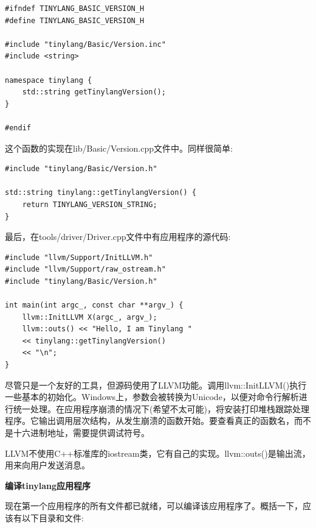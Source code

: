 \begin{lstlisting}[caption={}]
#ifndef TINYLANG_BASIC_VERSION_H
#define TINYLANG_BASIC_VERSION_H

#include "tinylang/Basic/Version.inc"
#include <string>

namespace tinylang {
	std::string getTinylangVersion();
}

#endif
\end{lstlisting}

这个函数的实现在lib/Basic/Version.cpp文件中。同样很简单:\par

\begin{lstlisting}[caption={}]
#include "tinylang/Basic/Version.h"

std::string tinylang::getTinylangVersion() {
	return TINYLANG_VERSION_STRING;
}
\end{lstlisting}

最后，在tools/driver/Driver.cpp文件中有应用程序的源代码:\par

\begin{lstlisting}[caption={}]
#include "llvm/Support/InitLLVM.h"
#include "llvm/Support/raw_ostream.h"
#include "tinylang/Basic/Version.h"

int main(int argc_, const char **argv_) {
	llvm::InitLLVM X(argc_, argv_);
	llvm::outs() << "Hello, I am Tinylang "
	<< tinylang::getTinylangVersion()
	<< "\n";
}
\end{lstlisting}

尽管只是一个友好的工具，但源码使用了LLVM功能。调用llvm::InitLLVM()执行一些基本的初始化。Windows上，参数会被转换为Unicode，以便对命令行解析进行统一处理。在应用程序崩溃的情况下(希望不太可能)，将安装打印堆栈跟踪处理程序。它输出调用层次结构，从发生崩溃的函数开始。要查看真正的函数名，而不是十六进制地址，需要提供调试符号。\par

LLVM不使用C++标准库的iostream类，它有自己的实现。llvm::outs()是输出流，用来向用户发送消息。\par

\hspace*{\fill} \par %
\textbf{编译tinylang应用程序}

现在第一个应用程序的所有文件都已就绪，可以编译该应用程序了。概括一下，应该有以下目录和文件:\par

